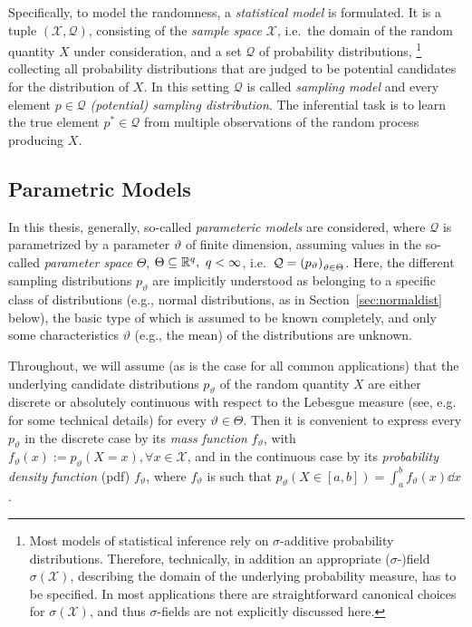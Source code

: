 Specifically, to model the randomness, a \emph{statistical model} is formulated.
It is a tuple $(\mathcal{X}, \mathcal{Q})$, consisting of the \emph{sample space} $\mathcal{X}$,
i.e.\ the domain of the random quantity $X$ under consideration,
and a set $\mathcal{Q}$ of probability distributions,%
\footnote{Most models of statistical inference rely on $\sigma$-additive probability distributions.
Therefore, technically, in addition an appropriate ($\sigma$-)field $\sigma(\mathcal{X})$,
describing the domain of the underlying probability measure, has to be specified.
In most applications there are straightforward canonical choices for $\sigma(\mathcal{X})$,
and thus $\sigma$-fields are not explicitly discussed here.}
collecting all probability distributions that are judged to be potential candidates for the distribution of $X$.
In this setting $\mathcal{Q}$ is called \emph{sampling model} and every element $p\in \mathcal{Q}$ \emph{(potential) sampling distribution}.
The inferential task is to learn the true element $p^* \in \mathcal{Q}$ from multiple observations of the random process producing $X$.


\subsection{Parametric Models}
\label{sec:parametricmodels}

In this thesis, generally, so-called \emph{parameteric models} are considered,
where $\mathcal{Q}$ is pa\-ra\-me\-trized by a parameter $\vartheta$ of finite dimension,
assuming values in the so-called \emph{parameter space} $\Theta$, $\Theta \subseteq \mathbb{R}^q, \ q < \infty$,
i.e.\ ${\cal Q}=\left(p_\vartheta\right)_{\vartheta \in \Theta}$.
Here, the different sampling distributions $p_\vartheta$ are implicitly understood as belonging to a specific class of distributions
(e.g., normal distributions, as in Section~\ref{sec:normaldist} below),
the basic type of which is assumed to be known completely,
and only some characteristics $\vartheta$ (e.g., the mean) of the distributions are unknown.

Throughout, we will assume (as is the case for all common applications)
that the underlying candidate distributions $p_\vartheta$ of the random quantity $X$
are either discrete or absolutely continuous with respect to the Lebesgue measure
(see, e.g. \textcite[pp.~32f, 38]{1993:karr} for some technical details) for every $\vartheta \in \Theta$.
Then it is convenient to express every $p_\vartheta$ in the discrete case by its \emph{mass function} $f_\vartheta$,
with $f_\vartheta(x):=p_\vartheta(X=x),\forall x \in \mathcal{X}$,
and in the continuous case by its \emph{probability density function} (pdf) $f_\vartheta$,
where $f_\vartheta$ is such that $p_\vartheta(X \in [a,b]) = \int_a^b f_\vartheta(x) \dd x$.


